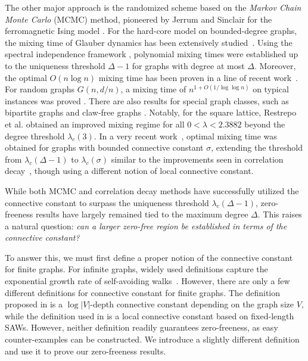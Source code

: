 \documentclass[a4paper,11pt]{article}
\theoremstyle{plain}
\theoremstyle{definition}
\theoremstyle{remark}
\newcommand{\1}{\mathbf{1}}
\begin{document}
The other major approach is the randomized scheme based on the \emph{Markov Chain Monte Carlo} (MCMC) method, pioneered by Jerrum and Sinclair for the ferromagnetic Ising model \cite{jerrum1993polynomial}.
For the hard-core model on bounded-degree graphs, the mixing time of Glauber dynamics has been extensively studied~\cite{luby1999fast,hayes2006coupling,efthymiou2016convergence}. Using the spectral independence framework \cite{anari2020spectral}, polynomial mixing times were established up to the uniqueness threshold $\Delta-1$ for graphs with degree at most $\Delta$. 
Moreover, the optimal $O(n\log n)$ mixing time  has been proven in a line of recent work~\cite{chen2020optimal,ChenE22,Chen0YZ22}.
For random graphs $G(n,d/n)$, a mixing time of $n^{1+O(1/\log\log n)}$ on typical instances was proved \cite{efthymiou2023mixing}.
There are also results for special graph classes, such as bipartite graphs and claw-free graphs \cite{chen2023uniqueness,chen2024fast,chen2024rapid,jerrum2024glauber,chen2025rapid}.
Notably, for the square lattice, Restrepo et al. \cite{restrepo2013improved} obtained an improved mixing regime for all $0<\lambda<2.3882$ beyond the degree threshold $\lambda_c(3)$.
In a very recent work~\cite{efthymiou2026sampling}, optimal mixing time was obtained for graphs with bounded connective constant $\sigma$, extending the threshold from $\lambda_c(\Delta-1)$ to $\lambda_c(\sigma)$ similar to the improvements seen in correlation decay~\cite{sinclair2017spatial}, though using a different notion of local connective constant.

While both MCMC and correlation decay methods have successfully utilized the connective constant to surpass the uniqueness threshold $\lambda_c(\Delta-1)$, 
zero-freeness results have largely remained tied to the maximum degree $\Delta$. 
This raises a natural question: 
\emph{can a larger zero-free region be established in terms of the connective constant?}

To answer this, we must first define a proper notion of the connective constant for finite graphs. For infinite graphs, widely used definitions capture the exponential growth rate of self-avoiding walks~\cite{hammersley1957percolation, lacoin2014non, grimmett2015bounds}.
However, there are only a few different definitions for connective constant for finite graphs. The definition proposed in \cite{sinclair2014approximation} is  a $\log |V|$-depth connective constant depending on the graph size $V$, while the definition used in \cite{efthymiou2026sampling} is a local connective constant based on fixed-length SAWs.
However, neither definition readily guarantees zero-freeness, as easy counter-examples can be constructed. We introduce a slightly different definition and use it to prove our zero-freeness results.
\end{document}
